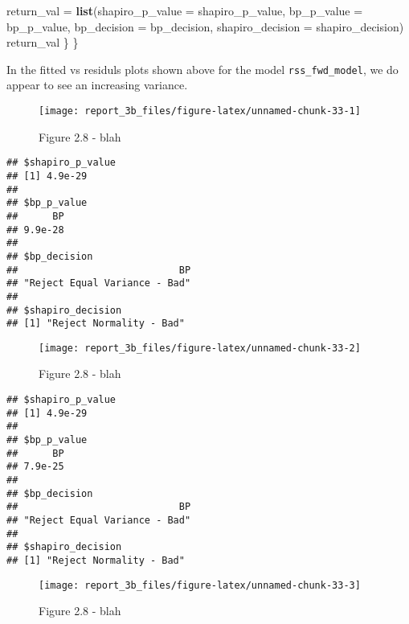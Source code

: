 \documentclass[
]{article}
\newenvironment{Shaded}{\begin{snugshade}}{\end{snugshade}}
\newcommand{\DataTypeTok}[1]{\textcolor[rgb]{0.13,0.29,0.53}{#1}}
\newcommand{\KeywordTok}[1]{\textcolor[rgb]{0.13,0.29,0.53}{\textbf{#1}}}
\newcommand{\NormalTok}[1]{#1}
\newcommand{\StringTok}[1]{\textcolor[rgb]{0.31,0.60,0.02}{#1}}
\begin{document}
\begin{Shaded}
\begin{Highlighting}[]
\NormalTok{    return_val =}\StringTok{ }\KeywordTok{list}\NormalTok{(}\DataTypeTok{shapiro_p_value =}\NormalTok{ shapiro_p_value, }\DataTypeTok{bp_p_value =}\NormalTok{ bp_p_value, }\DataTypeTok{bp_decision =}\NormalTok{ bp_decision, }\DataTypeTok{shapiro_decision =}\NormalTok{ shapiro_decision)}
\NormalTok{    return_val}
\NormalTok{  \}}
\NormalTok{\}}
\end{Highlighting}
\end{Shaded}

In the fitted vs residuls plots shown above for the model
\texttt{rss\_fwd\_model}, we do appear to see an increasing variance.

\begin{figure}

{\centering \texttt{[image: report\_3b\_files/figure-latex/unnamed-chunk-33-1]} 

}

\caption{ Figure 2.8 - blah}\label{fig:unnamed-chunk-331}
\end{figure}

\begin{verbatim}
## $shapiro_p_value
## [1] 4.9e-29
## 
## $bp_p_value
##      BP 
## 9.9e-28 
## 
## $bp_decision
##                            BP 
## "Reject Equal Variance - Bad" 
## 
## $shapiro_decision
## [1] "Reject Normality - Bad"
\end{verbatim}

\begin{figure}

{\centering \texttt{[image: report\_3b\_files/figure-latex/unnamed-chunk-33-2]} 

}

\caption{ Figure 2.8 - blah}\label{fig:unnamed-chunk-332}
\end{figure}

\begin{verbatim}
## $shapiro_p_value
## [1] 4.9e-29
## 
## $bp_p_value
##      BP 
## 7.9e-25 
## 
## $bp_decision
##                            BP 
## "Reject Equal Variance - Bad" 
## 
## $shapiro_decision
## [1] "Reject Normality - Bad"
\end{verbatim}

\begin{figure}

{\centering \texttt{[image: report\_3b\_files/figure-latex/unnamed-chunk-33-3]} 

}

\caption{ Figure 2.8 - blah}\label{fig:unnamed-chunk-333}
\end{figure}
\end{document}
